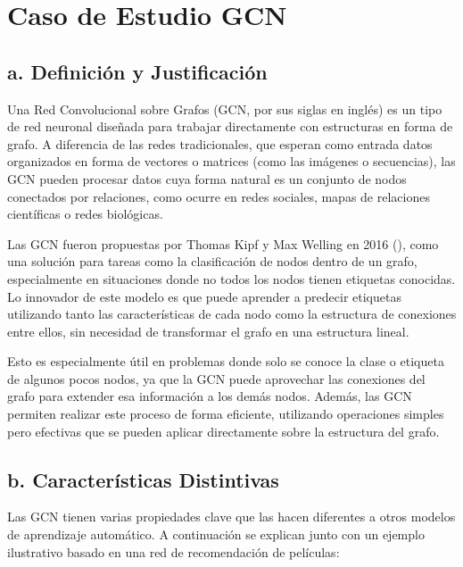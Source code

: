 \documentclass[11pt]{article} %
\begin{document}
\section{Caso de Estudio GCN} \vspace{10pt}

\subsection{a. Definición y Justificación}

Una Red Convolucional sobre Grafos (GCN, por sus siglas en inglés) es un tipo de red neuronal diseñada para trabajar directamente con estructuras en forma de grafo. A diferencia de las redes tradicionales, que esperan como entrada datos organizados en forma de vectores o matrices (como las imágenes o secuencias), las GCN pueden procesar datos cuya forma natural es un conjunto de nodos conectados por relaciones, como ocurre en redes sociales, mapas de relaciones científicas o redes biológicas.

Las GCN fueron propuestas por Thomas Kipf y Max Welling en 2016 (\cite{kipf2016semi}), como una solución para tareas como la clasificación de nodos dentro de un grafo, especialmente en situaciones donde no todos los nodos tienen etiquetas conocidas. Lo innovador de este modelo es que puede aprender a predecir etiquetas utilizando tanto las características de cada nodo como la estructura de conexiones entre ellos, sin necesidad de transformar el grafo en una estructura lineal.

Esto es especialmente útil en problemas donde solo se conoce la clase o etiqueta de algunos pocos nodos, ya que la GCN puede aprovechar las conexiones del grafo para extender esa información a los demás nodos. Además, las GCN permiten realizar este proceso de forma eficiente, utilizando operaciones simples pero efectivas que se pueden aplicar directamente sobre la estructura del grafo.

\subsection{b. Características Distintivas}

Las GCN tienen varias propiedades clave que las hacen diferentes a otros modelos de aprendizaje automático. A continuación se explican junto con un ejemplo ilustrativo basado en una red de recomendación de películas:
\end{document}
